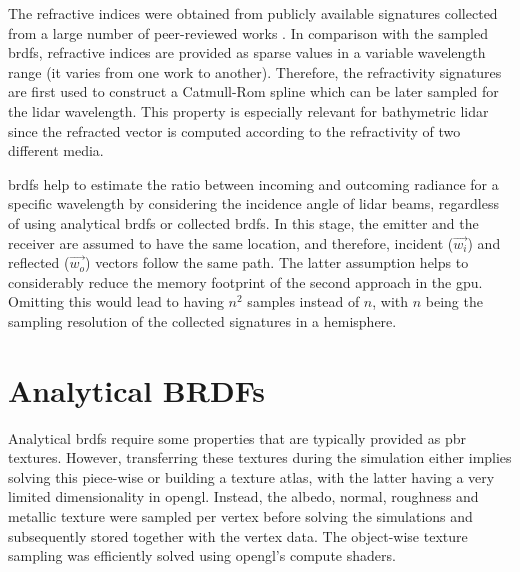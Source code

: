 The refractive indices were obtained from publicly available signatures collected from a large number of peer-reviewed works \cite{mikhail_n_polyanskiy_refractive_nodate}. In comparison with the sampled \acrshort{brdf}s, refractive indices are provided as sparse values in a variable wavelength range (it varies from one work to another). Therefore, the refractivity signatures are first used to construct a Catmull-Rom spline which can be later sampled for the \acrshort{lidar} wavelength. This property is especially relevant for bathymetric \acrshort{lidar} since the refracted vector is computed according to the refractivity of two different media.

\acrshort{brdf}s help to estimate the ratio between incoming and outcoming radiance for a specific wavelength by considering the incidence angle of \acrshort{lidar} beams, regardless of using analytical \acrshort{brdf}s or collected \acrshort{brdf}s. In this stage, the emitter and the receiver are assumed to have the same location, and therefore, incident ($\vec{w_{i}}$) and reflected ($\vec{w_{o}}$) vectors follow the same path. The latter assumption helps to considerably reduce the memory footprint of the second approach in the \acrshort{gpu}. Omitting this would lead to having $n^2$ samples instead of $n$, with $n$ being the sampling resolution of the collected signatures in a hemisphere. 

\section{Analytical BRDFs}

Analytical \acrshort{brdf}s require some properties that are typically provided as \acrshort{pbr} textures. However, transferring these textures during the simulation either implies solving this piece-wise or building a texture atlas, with the latter having a very limited dimensionality in \acrshort{opengl}. Instead, the albedo, normal, roughness and metallic texture were sampled per vertex before solving the simulations and subsequently stored together with the vertex data. The object-wise texture sampling was efficiently solved using \acrshort{opengl}'s compute shaders.

